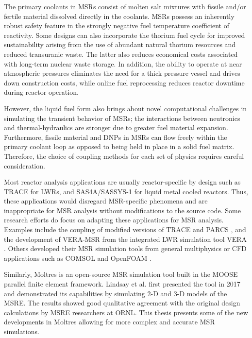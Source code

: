 The primary coolants in MSRs consist of molten salt mixtures
with fissile and/or fertile material dissolved directly in the coolants.
MSRs possess an inherently robust safety feature in the strongly negative fuel
temperature coefficient of reactivity. Some designs can also incorporate the
thorium fuel cycle for improved sustainability arising from the use of
abundant natural thorium resources and reduced transuranic waste. The
latter also reduces economical costs
associated with long-term nuclear waste storage. In addition, the ability to
operate at near atmospheric pressures eliminates the need for a thick pressure
vessel and drives down construction costs, while online fuel reprocessing
reduces reactor downtime during reactor operation.

However, the liquid fuel form also brings about novel computational
challenges in simulating the transient behavior of \glspl{MSR}; the
interactions between neutronics and thermal-hydraulics are stronger due
to greater fuel material expansion. Furthermore, fissile material and
\glspl{DNP} in \glspl{MSR} can flow freely within the primary coolant
loop as opposed to being held in place in a solid fuel matrix. Therefore,
the choice of coupling methods for each set of physics requires careful
consideration. 

Most reactor analysis applications are usually reactor-specific by
design such as TRACE \cite{nrc_trace_nodate} for \glspl{LWR}, and
SAS4A/SASSYS-1 \cite{fanning_sas4a/sassys-1_2017} for
liquid metal cooled reactors. Thus, these applications would disregard
\gls{MSR}-specific phenomena and are inappropriate for \gls{MSR}
analysis without modifications to the source code. Some research efforts
do focus on adapting these applications for \gls{MSR} analysis. Examples
include the coupling of modified versions of TRACE and PARCS
\cite{pettersen_coupled_2016}, and the development of VERA-MSR from the
integrated \gls{LWR} simulation tool VERA \cite{graham_development_2019}.
Others developed their \gls{MSR} simulation tools from general
multiphysics or \gls{CFD} applications such as COMSOL
\cite{fiorina_modelling_2014} and OpenFOAM \cite{aufiero_development_2014}.

Similarly, Moltres \cite{lindsay_introduction_2018} is an open-source MSR
simulation tool built in the \gls{MOOSE} \cite{gaston_physics-based_2015}
parallel finite element framework. Lindsay et al.
\cite{lindsay_introduction_2018} first presented the tool in 2017 and
demonstrated its capabilities by simulating 2-D and 3-D models of the
\gls{MSRE}. The results showed good qualitative
agreement with the original design calculations by \gls{MSRE} researchers at
\gls{ORNL}. This thesis presents some of the new developments in Moltres
allowing for more complex and accurate \gls{MSR} simulations.


